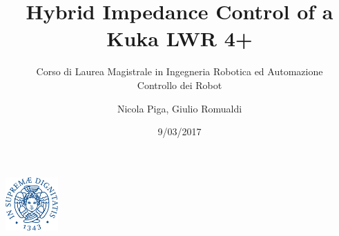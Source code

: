 \documentclass{beamer}
\date{9/03/2017}
\title[Hybrid Impedance Control]{Hybrid Impedance Control of a Kuka LWR 4+}
\subtitle{Corso di Laurea Magistrale in Ingegneria Robotica ed Automazione \\
  Controllo dei Robot}
\author{Nicola Piga, Giulio Romualdi}
\institute[]{Università di Pisa}
\begin{document}
\beamertemplatenavigationsymbolsempty

\begin{frame}
  \maketitle
  \centering
  \includegraphics[width=20mm]{cherubino}
\end{frame}




\end{document}
